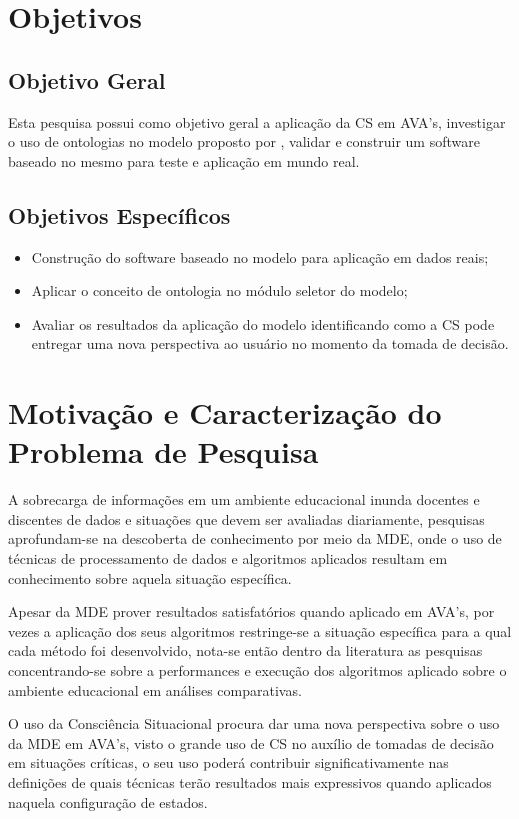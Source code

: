 \documentclass[
	oneside,
	12pt,				%
	a4paper,			%
	english,			%
	brazil,				%
	article
	]{abntex2}
\begin{document}
\section{Objetivos}

\subsection{Objetivo Geral}

Esta pesquisa possui como objetivo geral a aplicação da CS em AVA's, investigar o uso de ontologias no modelo proposto por , validar e construir um software baseado no mesmo para teste e aplicação em mundo real.

\subsection{Objetivos Específicos}

\begin{itemize}
	\item Construção do software baseado no modelo para aplicação em dados reais;
	\item Aplicar o conceito de ontologia no módulo seletor do modelo;
	\item Avaliar os resultados da aplicação do modelo identificando como a CS pode entregar uma nova perspectiva ao usuário no momento da tomada de decisão.  
\end{itemize}

\section{Motivação e Caracterização do Problema de Pesquisa}

A sobrecarga de informações em um ambiente educacional inunda docentes e discentes de dados e situações que devem ser avaliadas diariamente, pesquisas aprofundam-se na descoberta de conhecimento por meio da MDE, onde o uso de técnicas de processamento de dados e algoritmos aplicados resultam em conhecimento sobre aquela situação específica.

Apesar da MDE prover resultados satisfatórios quando aplicado em AVA's, por vezes a aplicação dos seus algoritmos restringe-se a situação específica para a qual cada método foi desenvolvido, nota-se então dentro da literatura as pesquisas concentrando-se sobre a performances e execução dos algoritmos aplicado sobre o ambiente educacional em análises comparativas. 

O uso da Consciência Situacional procura dar uma nova perspectiva sobre o uso da MDE em AVA's, visto o grande uso de CS no auxílio de tomadas de decisão em situações críticas, o seu uso poderá contribuir significativamente nas definições de quais técnicas terão resultados mais expressivos quando aplicados naquela configuração de estados.
\end{document}
